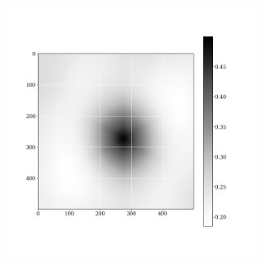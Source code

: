 \documentclass[12pt, a4paper]{report}
\begin{document}
\begin{figure}[H]
\begin{subfigure}{.32\textwidth}
  \label{img:microstrImg}
\end{subfigure}
\begin{subfigure}{.32\textwidth}
  \centering
  \includegraphics[width=0.9\textwidth]{Pictures/images9/hex_image_05_560.png}
  \label{img:microstrImg}
\end{subfigure}


\end{figure}
\end{document}
